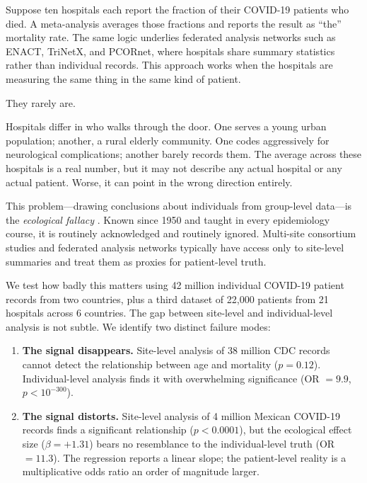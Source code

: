 \documentclass{article}
\begin{document}
Suppose ten hospitals each report the fraction of their COVID-19 patients who
died.  A meta-analysis averages those fractions and reports the result as
``the'' mortality rate.  The same logic underlies federated analysis
networks such as ENACT, TriNetX, and PCORnet, where hospitals share summary
statistics rather than individual records.  This approach works when the
hospitals are measuring the same thing in the same kind of patient.

They rarely are.

Hospitals differ in who walks through the door.  One serves a young urban
population; another, a rural elderly community.  One codes aggressively for
neurological complications; another barely records them.  The average across
these hospitals is a real number, but it may not describe any actual hospital
or any actual patient.  Worse, it can point in the wrong direction entirely.

This problem---drawing conclusions about individuals from group-level
data---is the \emph{ecological fallacy}
\cite{robinson1950ecological}.  Known since 1950 and taught in every
epidemiology course, it is routinely acknowledged and routinely ignored.
Multi-site consortium studies and federated analysis networks typically have
access only to site-level summaries and treat them as proxies for
patient-level truth.

We test how badly this matters using 42 million individual COVID-19 patient
records from two countries, plus a third dataset of 22,000 patients from 21
hospitals across 6 countries.  The gap between site-level and
individual-level analysis is not subtle.  We identify two distinct failure
modes:

\begin{enumerate}
\item \textbf{The signal disappears.}  Site-level analysis of 38 million CDC
records cannot detect the relationship between age and mortality
($p = 0.12$).  Individual-level analysis finds it with overwhelming
significance (OR $= 9.9$, $p < 10^{-300}$).

\item \textbf{The signal distorts.}  Site-level analysis of 4 million
Mexican COVID-19 records finds a significant relationship
($p < 0.0001$), but the ecological effect size ($\beta = +1.31$) bears no
resemblance to the individual-level truth (OR $= 11.3$).  The regression
reports a linear slope; the patient-level reality is a multiplicative odds
ratio an order of magnitude larger.
\end{enumerate}
\end{document}
